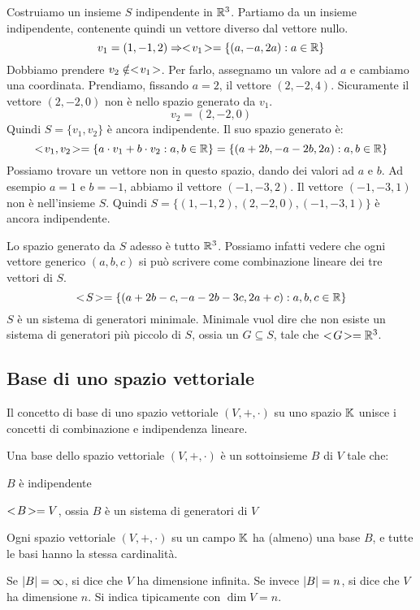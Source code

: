Costruiamo un insieme $S$ indipendente in $\mathbb{R}^3$. Partiamo da un insieme indipendente, contenente quindi un vettore diverso dal vettore nullo.
\[
v_1 = (1, -1, 2) \Rightarrow <\!{v_1}\!> = \{ (a, -a, 2a) : a \in \mathbb{R} \}
\]
Dobbiamo prendere $v_2 \notin <\!{v_1}\!>$. Per farlo, assegnamo un valore ad $a$ e cambiamo una coordinata. Prendiamo, fissando $a = 2$, il vettore $(2, -2, 4)$. Sicuramente il vettore $(2, -2, 0)$ non \`e nello spazio generato da $v_1$.
\[
v_2 = (2, -2, 0)
\]
Quindi $S = \{ v_1, v_2 \}$ \`e ancora indipendente. Il suo spazio generato \`e:
\[
<\!{v_1, v_2}\!> = \{ a \cdot v_1 + b \cdot v_2 : a, b \in \mathbb{R} \} = 
\{ (a + 2b, -a -2b, 2a) : a, b \in \mathbb{R} \}
\]
Possiamo trovare un vettore non in questo spazio, dando dei valori ad $a$ e $b$. Ad esempio $a = 1$ e $b = -1$, abbiamo il vettore $(-1, -3, 2)$. Il vettore $(-1, -3, 1)$ non \`e nell'insieme $S$. Quindi $S = \{(1, -1, 2), (2, -2, 0), (-1, -3, 1) \}$ \`e ancora indipendente.

Lo spazio generato da $S$ adesso \`e tutto $\mathbb{R}^3$. Possiamo infatti vedere che ogni vettore generico $(a,b,c)$ si pu\`o scrivere come combinazione lineare dei tre vettori di $S$.
\[
<\!{S}\!> = \{ (a + 2b - c, -a -2b -3c, 2a + c) : a, b, c \in \mathbb{R} \}
\]
$S$ \`e un sistema di generatori minimale. Minimale vuol dire che non esiste un sistema di generatori pi\`u piccolo di $S$, ossia un $G \subseteq S$, tale che $<\!{G}\!> = \mathbb{R}^3$.


\subsection{Base di uno spazio vettoriale}

Il concetto di base di uno spazio vettoriale $(V, +, \cdot)$ su uno spazio $\mathbb{K}$ unisce i concetti di combinazione e indipendenza lineare.

\begin{defn}
Una base dello spazio vettoriale $(V, +, \cdot)$ \`e un sottoinsieme $B$ di $V$ tale che:
\begin{description}
    \item $B$ \`e indipendente
    \item $<\!{B}\!> = V$, ossia $B$ \`e un sistema di generatori di $V$
\end{description}
\end{defn}

\begin{theorem}
Ogni spazio vettoriale $(V, +, \cdot)$ su un campo $\mathbb{K}$ ha (almeno) una base $B$, e tutte le basi hanno la stessa cardinalit\`a.
\end{theorem}
Se $\left\lvert{B}\right\rvert = \infty$, si dice che $V$ ha dimensione infinita. Se invece $\left\lvert{B}\right\rvert = n$, si dice che $V$ ha dimensione $n$. Si indica tipicamente con $\dim V = n$.

